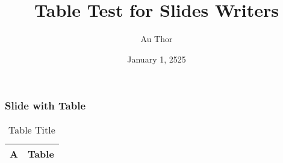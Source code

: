 \documentclass[t,english]{beamer}
\newlength{\DUtablewidth} %
\begin{document}
\title[Table Test for Slides Writers]{Table Test for Slides Writers%
  \label{table-test-for-slides-writers}}
\author[Au Thor]{Au Thor}
\date{January 1, 2525}
\maketitle

\begin{frame}%
\frametitle{Slide with Table}

\setlength{\DUtablewidth}{\linewidth}
\begin{longtable}[c]{|p{0.063\DUtablewidth}|p{0.075\DUtablewidth}|}
\caption{Table Title}\\
\hline

A
 & 
Table
 \\
\hline
\end{longtable}
\end{frame}
\end{document}
